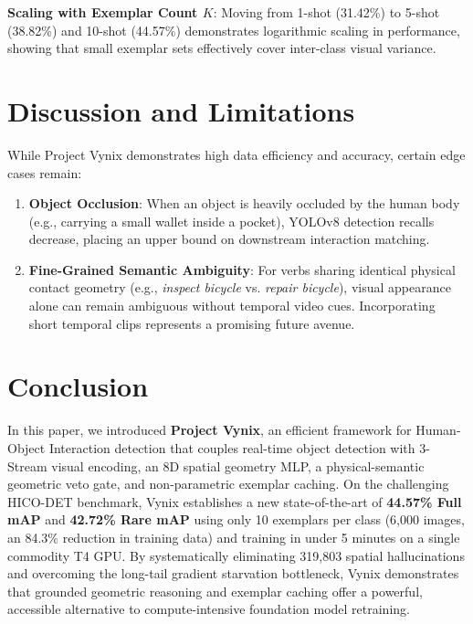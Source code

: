 \documentclass[conference]{IEEEtran}
\begin{document}
\textbf{Scaling with Exemplar Count $K$}: Moving from 1-shot (31.42\%) to 5-shot (38.82\%) and 10-shot (44.57\%) demonstrates logarithmic scaling in performance, showing that small exemplar sets effectively cover inter-class visual variance.

\section{Discussion and Limitations}
While Project Vynix demonstrates high data efficiency and accuracy, certain edge cases remain:
\begin{enumerate}
    \item \textbf{Object Occlusion}: When an object is heavily occluded by the human body (e.g., carrying a small wallet inside a pocket), YOLOv8 detection recalls decrease, placing an upper bound on downstream interaction matching.
    \item \textbf{Fine-Grained Semantic Ambiguity}: For verbs sharing identical physical contact geometry (e.g., \textit{inspect bicycle} vs. \textit{repair bicycle}), visual appearance alone can remain ambiguous without temporal video cues. Incorporating short temporal clips represents a promising future avenue.
\end{enumerate}

\section{Conclusion}
In this paper, we introduced \textbf{Project Vynix}, an efficient framework for Human-Object Interaction detection that couples real-time object detection with 3-Stream visual encoding, an 8D spatial geometry MLP, a physical-semantic geometric veto gate, and non-parametric exemplar caching. On the challenging HICO-DET benchmark, Vynix establishes a new state-of-the-art of \textbf{44.57\% Full mAP} and \textbf{42.72\% Rare mAP} using only 10 exemplars per class (6,000 images, an 84.3\% reduction in training data) and training in under 5 minutes on a single commodity T4 GPU. By systematically eliminating 319,803 spatial hallucinations and overcoming the long-tail gradient starvation bottleneck, Vynix demonstrates that grounded geometric reasoning and exemplar caching offer a powerful, accessible alternative to compute-intensive foundation model retraining.
\end{document}

